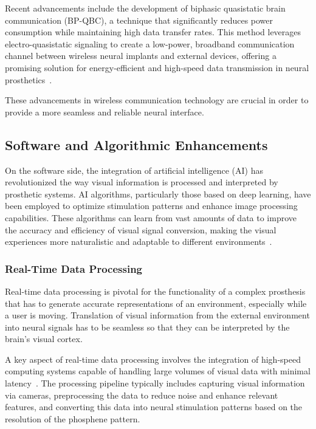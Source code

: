 \documentclass[twocolumn,10pt]{article}
\begin{document}
Recent advancements include the development of biphasic quasistatic brain
communication (BP-QBC), a technique that significantly reduces power consumption
while maintaining high data transfer rates. This method leverages
electro-quasistatic signaling to create a low-power, broadband communication
channel between wireless neural implants and external devices, offering a
promising solution for energy-efficient and high-speed data transmission in
neural prosthetics~\parencite{chatterjeeBiphasicQuasistaticBrain2023}.

These advancements in wireless communication technology are crucial in order to
provide a more seamless and reliable neural interface.

\subsection*{Software and Algorithmic Enhancements}
On the software side, the integration of artificial intelligence (AI) has
revolutionized the way visual information is processed and interpreted by
prosthetic systems. AI algorithms, particularly those based on deep learning,
have been employed to optimize stimulation patterns and enhance image processing
capabilities. These algorithms can learn from vast amounts of data to improve
the accuracy and efficiency of visual signal conversion, making the visual
experiences more naturalistic and adaptable to different
environments~\parencite{romeniMachineLearningFramework2021}.

\subsubsection*{Real-Time Data Processing}
Real-time data processing is pivotal for the functionality of a complex
prosthesis that has to generate accurate representations of an environment,
especially while a user is moving. Translation of visual information from the
external environment into neural signals has to be seamless so that they can be
interpreted by the brain's visual cortex.

A key aspect of real-time data processing involves the integration of high-speed
computing systems capable of handling large volumes of visual data with minimal
latency~\parencite{nurmikkoChallengesLargeScaleCortical2020}. The processing
pipeline typically includes capturing visual information via cameras,
preprocessing the data to reduce noise and enhance relevant features, and
converting this data into neural stimulation patterns based on the resolution of
the phosphene pattern.
\end{document}
